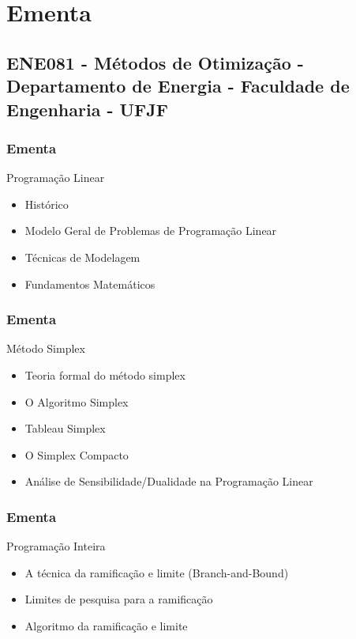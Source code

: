 \documentclass{beamer}
\begin{document}
\section{Ementa}
\subsection{ENE081 - Métodos de Otimização - Departamento de Energia - Faculdade de Engenharia - UFJF}

\begin{frame}
	\frametitle{Ementa}
	\begin{block}{Programação Linear}
		\begin{itemize}
			\item Histórico
			\item Modelo Geral de Problemas de Programação Linear
			\item Técnicas de Modelagem
			\item Fundamentos Matemáticos
		\end{itemize}
	\end{block}
\end{frame}

\begin{frame}
	\frametitle{Ementa}
	\begin{block}{Método Simplex}
		\begin{itemize}
			\item Teoria formal do método simplex
			\item O Algoritmo Simplex
			\item Tableau Simplex
			\item O Simplex Compacto
			\item Análise de Sensibilidade/Dualidade na Programação Linear
		\end{itemize}
	\end{block}
\end{frame}

\begin{frame}
	\frametitle{Ementa}
	\begin{block}{Programação Inteira}
		\begin{itemize}
			\item A técnica da ramificação e limite (Branch-and-Bound)
			\item Limites de pesquisa para a ramificação
			\item Algoritmo da ramificação e limite
		\end{itemize}
	\end{block}
\end{frame}
\end{document}
